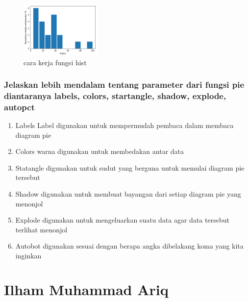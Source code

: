 
\begin{figure}[ht]	
    \includegraphics[width=4cm]{figures/6/1174083/Teori/7.png}
    \centering
    \caption{cara kerja fungsi hist}
    \label{6}
\end{figure}
\newpage
\subsubsection{Jelaskan lebih mendalam tentang parameter dari fungsi pie diantaranya labels, colors, startangle, shadow, explode, autopct}
\begin{enumerate}
\item Labels Label digunakan untuk mempermudah pembaca dalam membaca diagram pie
\item Colors  warna digunakan untuk membedakan antar data
\item Statangle digunakan untuk sudut yang berguna untuk memulai diagram pie tersebut
\item Shadow digunakan untuk membuat bayangan dari setiap diagram pie yang menonjol
\item Explode digunakan untuk mengeluarkan suatu data agar data tersebut terlihat menonjol
\item Autobot digunakan sesuai dengan berapa angka dibelakang koma yang kita inginkan
\end{enumerate}
\section{Ilham Muhammad Ariq}
